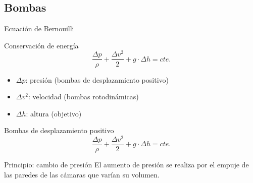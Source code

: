 \documentclass[xcolor={usenames,svgnames,dvipsnames}]{beamer}
\begin{document}
\subsection{Bombas}
\label{sec:org153985b}

\begin{frame}[label={sec:org0075695}]{Ecuación de Bernouilli}
\begin{block}{Conservación de energía}
$$\frac{\Delta p}{\rho}+\frac{\Delta v^2}{2}+g\cdot\Delta h=cte.$$
\begin{itemize}
\item \(\Delta p\): presión (bombas de desplazamiento positivo)
\item \(\Delta v^2\): velocidad (bombas rotodinámicas)
\item \(\Delta h\): altura (objetivo)
\end{itemize}
\end{block}
\end{frame}


\begin{frame}[label={sec:org7f8c7d6}]{Bombas de desplazamiento positivo}
\[
\frac{\Delta p}{\rho}+\frac{\Delta v^2}{2}+g\cdot\Delta h=cte.
\]

\begin{block}{\alert{Principio}: cambio de presión}
El aumento de presión se realiza por el empuje de las paredes de las cámaras que varían su volumen.
\end{block}
\end{frame}
\end{document}

